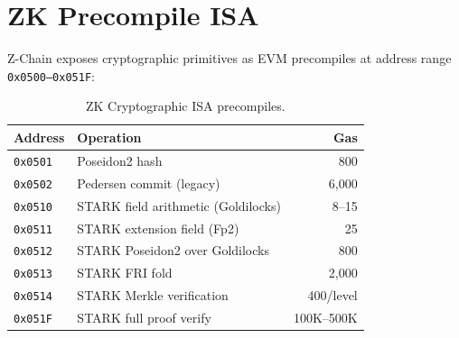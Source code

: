 \section{ZK Precompile ISA}


Z-Chain exposes cryptographic primitives as EVM precompiles at address range \texttt{0x0500--0x051F}:

\begin{table}[h]
\centering
\begin{tabular}{llr}
\toprule
\textbf{Address} & \textbf{Operation} & \textbf{Gas} \\
\midrule
\texttt{0x0501} & Poseidon2 hash & 800 \\
\texttt{0x0502} & Pedersen commit (legacy) & 6,000 \\
\texttt{0x0510} & STARK field arithmetic (Goldilocks) & 8--15 \\
\texttt{0x0511} & STARK extension field (Fp2) & 25 \\
\texttt{0x0512} & STARK Poseidon2 over Goldilocks & 800 \\
\texttt{0x0513} & STARK FRI fold & 2,000 \\
\texttt{0x0514} & STARK Merkle verification & 400/level \\
\texttt{0x051F} & STARK full proof verify & 100K--500K \\
\bottomrule
\end{tabular}
\caption{ZK Cryptographic ISA precompiles.}
\end{table}


